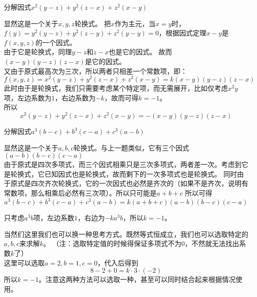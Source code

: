 \documentclass[windows,csize4]{BHCexam}
\begin{document}
\begin{groups}
\begin{questions}[]
        \question[5] 分解因式$x^2(y-z)+y^2(z-x)+z^2(x-y)$
        \begin{solution}{0.5cm}
            \methodonly 显然这是一个关于$x,y,z$轮换式。
            把$x$作为主元，当$x=y$时，$f(y)=y^2(y-z)+y^2(z-y)+z^2(y-y)=0$，根据因式定理$x-y$是$f(x,y,z)$的一个因式。 \\
            由于它是轮换式，同理$y-z$和$z-x$也是它的因式。 故而$(x-y)(y-z)(z-x)$是它的因式。\\
            又由于原式最高次为三次，所以两者只相差一个常数项，即： \\
            \[
                f(x,y,z)= x^2(y-z)+y^2(z-x)+z^2(x-y) = k(x-y)(y-z)(z-x)
            \]
            此时由于是轮换式，我们只需要考虑某个特定项，而无需展开，比如仅考虑$x^2y$项，左边系数为$1$，右边系数为$-k$，故而可得$k=-1$。 \\
            所以
            \[
                x^2(y-z)+y^2(z-x)+z^2(x-y) = -(x-y)(y-z)(z-x)
            \]

        \end{solution}
        \vspace{3.5cm}

        \question[5] 分解因式$a^3(b-c)+b^3(c-a)+c^3(a-b)$
        \begin{solution}{0.5cm}
            \methodonly 显然这是一个关于$a,b,c$轮换式。与上一题类似，它有三个因式$(a-b)(b-c)(c-a)$ \\
            由于原式是四次多项式，而三个因式相乘只是三次多项式，两者差一次。考虑到它是轮换式，它已知因式也是轮换式，故而剩下的一次多项式也是轮换式。
            同时由于原式是四次齐次轮换式，它的一次因式也必然是齐次的（如果不是齐次，说明有常数项，那么相乘后必然有三次项）。所以只可能是$a+b+c$
            所以可得
            \[
                a^3(b-c)+b^3(c-a)+c^3(a-b)= k(a+b+c)(a-b)(b-c)(c-a)
            \]

            只考虑$a^3b$项，左边系数$1$，右边为$-ka^3b$，所以$k=-1$。

            当然们这里我们也可以换一种思考方式。既然等式恒成立，我们也可以选取特定的$a,b,c$来求解$k$。
            （注：选取特定值的时候得保证多项式不为0，不然就无法找出系数$k$了） \\
            这里可以选取$a=2,b=1,c=0$，代入后得到
            \[
                8-2+0=k\cdot 3  \cdot (-2)
            \]
            所以$k=-1$。注意这两种方法可以选取一种，甚至可以同时结合起来根据情况使用。
        \end{solution}
        \vspace{3.5cm}


\end{questions}
\end{groups}
\end{document}
